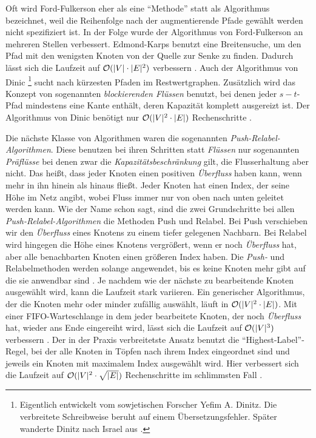 Oft wird Ford-Fulkerson eher als eine \enquote{Methode} statt als Algorithmus bezeichnet, weil die Reihenfolge nach der augmentierende Pfade gewählt werden nicht spezifiziert ist. In der Folge wurde der Algorithmus von Ford-Fulkerson an mehreren Stellen verbessert. Edmond-Karps benutzt eine Breitensuche, um den Pfad mit den wenigsten Knoten von der Quelle zur Senke zu finden. Dadurch lässt sich die Laufzeit auf $\mathcal{O}(|V|\cdot |E|^2)$ verbessern \citep{clrs09}. Auch der Algorithmus von Dinic \footnote{Eigentlich entwickelt vom sowjetischen Forscher Yefim A. Dinitz. Die verbreitete Schreibweise beruht auf einem Übersetzungsfehler. Später wanderte Dinitz nach Israel aus \citep{d06}.} sucht nach kürzesten Pfaden im Restwertgraphen. Zusätzlich wird das Konzept von sogenannten \emph{blockierenden Flüssen} benutzt, bei denen jeder $s-t$-Pfad mindestens eine Kante enthält, deren Kapazität komplett ausgereizt ist. Der Algorithmus von Dinic benötigt nur $\mathcal{O}(|V|^2\cdot |E|)$ Rechenschritte \citep{d06}.

Die nächste Klasse von Algorithmen waren die sogenannten \emph{Push-Relabel-Algorithmen}. Diese benutzen bei ihren Schritten statt \emph{Flüssen} nur sogenannten \emph{Präflüsse} bei denen zwar die \emph{Kapazitätsbeschränkung} gilt, die Flusserhaltung aber nicht. Das heißt, dass jeder Knoten einen positiven \emph{Überfluss} haben kann, wenn mehr in ihn hinein als hinaus fließt. Jeder Knoten hat einen Index, der seine Höhe im Netz angibt, wobei Fluss immer nur von oben nach unten geleitet werden kann. Wie der Name schon sagt, sind die zwei Grundschritte bei allen \emph{Push-Relabel-Algorithmen} die Methoden Push und Relabel. Bei Push verschieben wir den \emph{Überfluss} eines Knotens zu einem tiefer gelegenen Nachbarn. Bei Relabel wird hingegen die Höhe eines Knotens vergrößert, wenn er noch \emph{Überfluss} hat, aber alle benachbarten Knoten einen größeren Index haben. Die \emph{Push-} und Relabelmethoden werden solange angewendet, bis es keine Knoten mehr gibt auf die sie anwendbar sind \citep{clrs09}. Je nachdem wie der nächste zu bearbeitende Knoten ausgewählt wird, kann die Laufzeit stark variieren. Ein generischer Algorithmus, der die Knoten mehr oder minder zufällig auswählt, läuft in $\mathcal{O}(|V|^2\cdot |E|)$. Mit einer FIFO-Warteschlange in dem jeder bearbeitete Knoten, der noch \emph{Überfluss} hat, wieder ans Ende eingereiht wird, lässt sich die Laufzeit auf $\mathcal{O}(|V|^3)$ verbessern \citep{gt88}. Der in der Praxis verbreitetste Ansatz benutzt die \enquote{Highest-Label}-Regel, bei der alle Knoten in Töpfen nach ihrem Index eingeordnet sind und jeweils ein Knoten mit maximalem Index ausgewählt wird. Hier verbessert sich die Laufzeit auf $\mathcal{O}(|V|^2\cdot \sqrt{|E|})$ Rechenschritte im schlimmsten Fall \citep{akmo97}.

